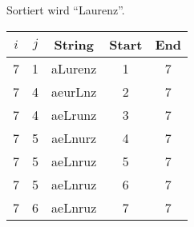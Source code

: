 \documentclass{article}
\begin{document}
Sortiert wird \enquote{Laurenz}.

\begin{center}
    \begin{tabular}{c c c c c}\toprule
        $i$ & $j$ & String & Start & End \\\midrule
        7 & 1 & aLurenz & 1 & 7 \\
        7 & 4 & aeurLnz & 2 & 7 \\
        7 & 4 & aeLrunz & 3 & 7 \\
        7 & 5 & aeLnurz & 4 & 7 \\
        7 & 5 & aeLnruz & 5 & 7 \\
        7 & 5 & aeLnruz & 6 & 7 \\
        7 & 6 & aeLnruz & 7 & 7 \\\bottomrule
    \end{tabular}
\end{center}
\end{document}
